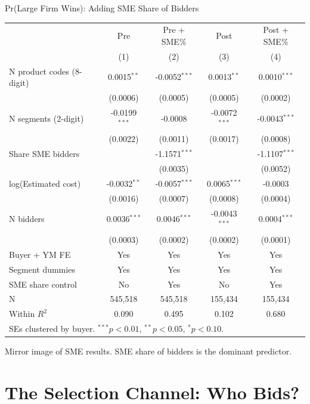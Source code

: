 \documentclass[9pt,aspectratio=169]{beamer}
\begin{document}
\begin{frame}{Pr(Large Firm Wins): Adding SME Share of Bidders}
\centering\small
\begin{tabular}{lcccc}
\toprule
 & Pre & Pre + SME\% & Post & Post + SME\% \\
 & (1) & (2) & (3) & (4) \\
\midrule
N product codes (8-digit) & 0.0015$^{**}$ & -0.0052$^{***}$ & 0.0013$^{**}$ & 0.0010$^{***}$ \\
 & (0.0006) & (0.0005) & (0.0005) & (0.0002) \\[2pt]
N segments (2-digit) & -0.0199$^{***}$ & -0.0008 & -0.0072$^{***}$ & -0.0043$^{***}$ \\
 & (0.0022) & (0.0011) & (0.0017) & (0.0008) \\[2pt]
Share SME bidders &  & -1.1571$^{***}$ &  & -1.1107$^{***}$ \\
 &  & (0.0035) &  & (0.0052) \\[2pt]
log(Estimated cost) & -0.0032$^{**}$ & -0.0057$^{***}$ & 0.0065$^{***}$ & -0.0003 \\
 & (0.0016) & (0.0007) & (0.0008) & (0.0004) \\[2pt]
N bidders & 0.0036$^{***}$ & 0.0046$^{***}$ & -0.0043$^{***}$ & 0.0004$^{***}$ \\
 & (0.0003) & (0.0002) & (0.0002) & (0.0001) \\[2pt]
\midrule
Buyer + YM FE & Yes & Yes & Yes & Yes \\
Segment dummies & Yes & Yes & Yes & Yes \\
SME share control & No & Yes & No & Yes \\
N & 545,518 & 545,518 & 155,434 & 155,434 \\
Within $R^2$ & 0.090 & 0.495 & 0.102 & 0.680 \\
\bottomrule
\multicolumn{5}{l}{\footnotesize SEs clustered by buyer. $^{***}p<0.01$, $^{**}p<0.05$, $^{*}p<0.10$.} \\
\end{tabular}

\medskip
\small Mirror image of SME results. SME share of bidders is the dominant predictor.
\end{frame}

\section{The Selection Channel: Who Bids?}
\end{document}
